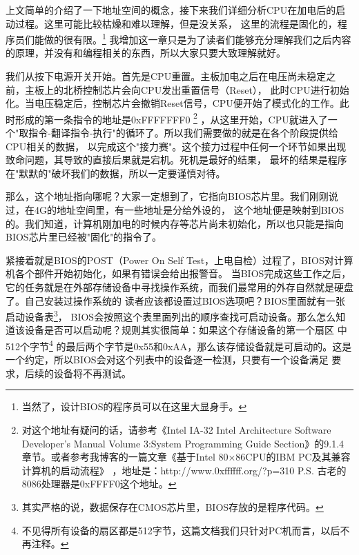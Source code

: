 \par 上文简单的介绍了一下地址空间的概念，接下来我们详细分析CPU在加电后的启动过程。这里可能比较枯燥和难以理解，但是没关系，\allowbreak
这里的流程是固化的，程序员们能做的很有限。\footnote{当然了，设计BIOS的程序员可以在这里大显身手。}\allowbreak
我增加这一章只是为了读者们能够充分理解我们之后内容的原理，并没有和编程相关的东西，所以大家只要大致理解就好。

\par 我们从按下电源开关开始。首先是CPU重置。主板加电之后在电压尚未稳定之前，主板上的北桥控制芯片会向CPU发出重置信号（Reset），\allowbreak
此时CPU进行初始化。当电压稳定后，控制芯片会撤销Reset信号，CPU便开始了模式化的工作。此时形成的第一条指令的地址是0xFFFFFFF0\allowbreak
\footnote{对这个地址有疑问的话，请参考《Intel IA-32 Intel Architecture Software Developer’s Manual Volume 3:System \allowbreak
Programming Guide Section》的9.1.4 章节。或者参考我博客的一篇文章《基于Intel 80×86CPU的IBM PC及其兼容计算机的启动流程》\allowbreak
，地址是：http://www.0xffffff.org/?p=310 P.S. 古老的8086处理器是0xFFFF0这个地址。}\allowbreak
，从这里开始，CPU就进入了一个"取指令-翻译指令-执行"的循环了。所以我们需要做的就是在各个阶段提供给CPU相关的数据，\allowbreak
以完成这个"接力赛"。这个接力过程中任何一个环节如果出现致命问题，其导致的直接后果就是宕机。死机是最好的结果，\allowbreak
最坏的结果是程序在"默默的"破坏我们的数据，所以一定要谨慎对待。

\par 那么，这个地址指向哪呢？大家一定想到了，它指向BIOS芯片里。我们刚刚说过，在4G的地址空间里，有一些地址是分给外设的，\allowbreak
这个地址便是映射到BIOS的。我们知道，计算机刚加电的时候内存等芯片尚未初始化，所以也只能是指向BIOS芯片里已经被"固化"的指令了。\allowbreak

\par 紧接着就是BIOS的POST（Power On Self Test，上电自检）过程了，BIOS对计算机各个部件开始初始化，如果有错误会给出报警音。\allowbreak
当BIOS完成这些工作之后，它的任务就是在外部存储设备中寻找操作系统，而我们最常用的外存自然就是硬盘了。自己安装过操作系统的\allowbreak
读者应该都设置过BIOS选项吧？BIOS里面就有一张启动设备表\footnote{其实严格的说，数据保存在CMOS芯片里，BIOS存放的是程序代码。}，\allowbreak
BIOS会按照这个表里面列出的顺序查找可启动设备。那么怎么知道该设备是否可以启动呢？规则其实很简单：如果这个存储设备的第一个扇区\allowbreak
中512个字节\footnote{不见得所有设备的扇区都是512字节，这篇文档我们只针对PC机而言，以后不再注释。}\allowbreak
的最后两个字节是0x55和0xAA，那么该存储设备就是可启动的。这是一个约定，所以BIOS会对这个列表中的设备逐一检测，只要有一个设备满足\allowbreak
要求，后续的设备将不再测试。


